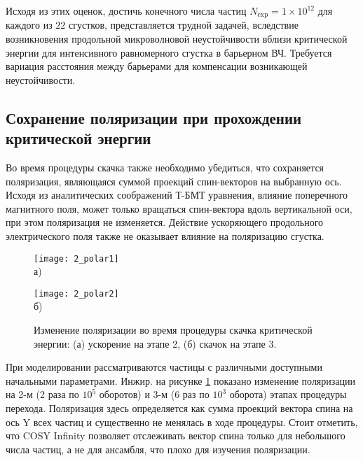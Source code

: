 \par Исходя из этих оценок, достичь конечного числа частиц $N_{\textrm{exp}}=1\times10^{12}$ для каждого из $22$ сгустков, представляется трудной задачей, вследствие возникновения продольной микроволновой неустойчивости вблизи критической энергии для интенсивного равномерного сгустка в барьерном ВЧ. Требуется вариация расстояния между барьерами для компенсации возникающей	неустойчивости.

	\subsection{Сохранение поляризации при прохождении критической энергии}\label{subsec:transition_jump/regular/polarization}

\par Во время процедуры скачка также необходимо убедиться, что сохраняется поляризация, являющаяся суммой проекций спин-векторов на выбранную ось. Исходя из аналитических соображений Т-БМТ уравнения, влияние поперечного магнитного поля, может только вращаться спин-вектора вдоль вертикальной оси, при этом поляризация не изменяется. Действие ускоряющего продольного электрического поля также не оказывает влияние на поляризацию сгустка.

\begin{figure}[!h]    
    \begin{minipage}[b][][b]{0.49\linewidth}\centering
        \texttt{[image: 2\_polar1]} \\ а)
    \end{minipage}
    \hfill
    \begin{minipage}[b][][b]{0.49\linewidth}\centering
        \texttt{[image: 2\_polar2]} \\ б)
    \end{minipage}
    \caption{Изменение поляризации во время процедуры скачка критической энергии: (а) ускорение на этапе 2, (б) скачок на этапе 3.}
    \label{fig:polar}
\end{figure}

\par При моделировании рассматриваются частицы с различными доступными начальными параметрами. Инжир. на рисунке \ref{fig:polar} показано изменение поляризации на 2-м (2 раза по $10^5$ оборотов) и 3-м (6 раз по $10^3$ оборота) этапах процедуры перехода. Поляризация здесь определяется как сумма проекций вектора спина на ось Y всех частиц и существенно не менялась в ходе процедуры. Стоит отметить, что COSY Infinity позволяет отслеживать вектор спина только для небольшого числа частиц, а не для ансамбля, что плохо для изучения поляризации.

